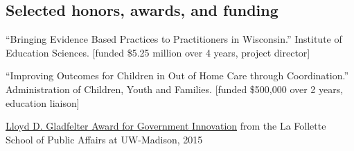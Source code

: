\documentclass[margin,line]{res}
\newenvironment{list1}{
  \begin{list}{\ding{113}}{%
      \setlength{\itemsep}{0in}
      \setlength{\parsep}{0in} \setlength{\parskip}{0in}
      \setlength{\topsep}{0in} \setlength{\partopsep}{0in} 
      \setlength{\leftmargin}{0.17in}}}{\end{list}}
\newenvironment{list2}{
  \begin{list}{$\bullet$}{%
      \setlength{\itemsep}{0in}
      \setlength{\parsep}{0in} \setlength{\parskip}{0in}
      \setlength{\topsep}{0in} \setlength{\partopsep}{0in} 
      \setlength{\leftmargin}{0.2in}}}{\end{list}}
\begin{document}
\begin{resume}
% 
% 
% 

\vspace*{-4mm}
\section{\sc Selected honors, awards, and funding} 

``Bringing Evidence Based Practices to Practitioners in Wisconsin.''
Institute of Education Sciences. [funded \$5.25 million over 4 years, project director]

\vspace*{-2.5mm}

``Improving Outcomes for Children in Out of Home Care through Coordination.'' 
Administration of Children, Youth and Families. [funded \$500,000 over 2 years, education liaison]

\vspace*{-2.5mm}

\href{https://www.lafollette.wisc.edu/news/2015-gladfelter-winners-announced}{Lloyd D. Gladfelter Award for Government Innovation} from the La Follette School of Public Affairs at UW-Madison, 2015


\end{resume}
\end{document}
